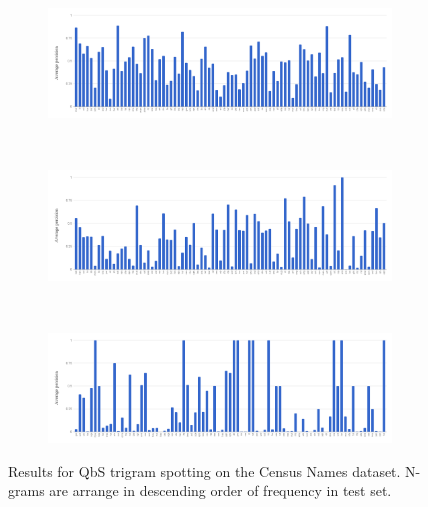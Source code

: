 \documentclass[ms,electronic,twosidetoc,letterpaper,chaptercenter,parttop,lof,lot]{byumsphd}
\begin{document}
\begin{figure}
\centering
\begin{subfigure}{.99\textwidth}
  \centering
  \includegraphics[width=.99\linewidth]{namesTri1Spot}
  \label{fig:namesTri1Spot}
\end{subfigure}
\\
\begin{subfigure}{.99\textwidth}
  \centering
  \includegraphics[width=.99\linewidth]{namesTri2Spot}
  \label{fig:namesTri2Spot}
\end{subfigure}
\\
\begin{subfigure}{.99\textwidth}
  \centering
  \includegraphics[width=.99\linewidth]{namesTri3Spot}
  \label{fig:namesTri3Spot}
\end{subfigure}
\caption{Results for QbS trigram spotting on the Census Names dataset. N-grams are arrange in descending order of frequency in test set.}
\label{fig:namessub2}
\end{figure}




\end{document}
